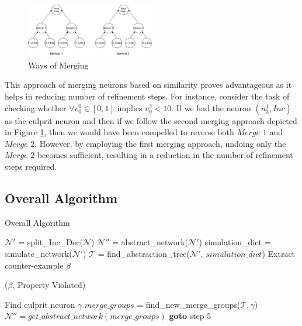 \begin{figure}[H]
    \centering
    \includegraphics[width = 0.5\textwidth]{diagrams/good_vs_bad_merges.pdf}
    \caption{Ways of Merging}
    \label{Figure 3}
\end{figure}

This approach of merging neurons based on similarity proves advantageous as it helps in reducing number of refinement steps. For instance, consider the task of checking whether $\forall v_{0}^{0} \in [0, 1]$ implies $v_{0}^{2} < 10$. If we had the neuron $(n_{3}^{1}, Inc)$ as the culprit neuron and then if we follow the second merging approach depicted in Figure \ref{Figure 3}, then we would have been compelled to reverse both $\textit{Merge 1}$ and $\textit{Merge 2}$. However, by employing the first merging approach, undoing only the $\textit{Merge 2}$ becomes sufficient, resulting in a reduction in the number of refinement steps required.


\subsection{Overall Algorithm}
\begin{algorithm}[H]
    \caption{Overall Algorithm}
    \label{Overall Algorithm}
    \begin{algorithmic}[1]
        \State $\mathcal{N'}$ = split\_Inc\_Dec($\mathcal{N}$)
        \State $\mathcal{N''}$ = abstract\_network($\mathcal{N'}$)
        \State simulation\_dict = simulate\_network($\mathcal{N'}$)
        \State $\mathcal{T}$ = find\_abstraction\_tree($\mathcal{N'}$, $simulation\_dict$)
        \Else
            \State Extract counter-example $\beta$
            {

                \Return ($\beta$, Property Violated)
            }
            \Else
                \State Find culprit neuron $\gamma$
                \State $merge\_groups$ = find\_new\_merge\_groups($\mathcal{T, \gamma}$)
                \State $\mathcal{N''} = get\_abstract\_network(merge\_groups)$
                \State \textbf{goto} step 5
            \EndIf
        \EndIf
    \end{algorithmic}
\end{algorithm}
